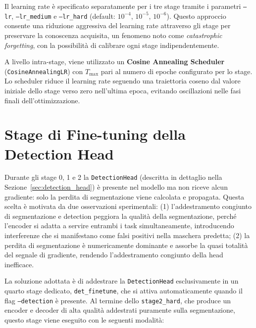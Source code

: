 Il learning rate è specificato separatamente per i tre stage tramite i parametri \texttt{--lr}, \texttt{--lr\_medium} e \texttt{--lr\_hard} (default: $10^{-4}$, $10^{-5}$, $10^{-6}$). Questo approccio consente una riduzione aggressiva del learning rate attraverso gli stage per preservare la conoscenza acquisita, un fenomeno noto come \textit{catastrophic forgetting}, con la possibilità di calibrare ogni stage indipendentemente.

A livello intra-stage, viene utilizzato un \textbf{Cosine Annealing Scheduler}~\cite{loshchilov2017sgdrstochasticgradientdescent} (\texttt{CosineAnnealingLR}) con $T_{\max}$ pari al numero di epoche configurato per lo stage. Lo scheduler riduce il learning rate seguendo una traiettoria coseno dal valore iniziale dello stage verso zero nell'ultima epoca, evitando oscillazioni nelle fasi finali dell'ottimizzazione.

\section{Stage di Fine-tuning della Detection Head}
\label{sec:det_finetune}

Durante gli stage 0, 1 e 2 la \texttt{DetectionHead} (descritta in dettaglio nella Sezione~\ref{sec:detection_head}) è presente nel modello ma non riceve alcun gradiente: solo la perdita di segmentazione viene calcolata e propagata. Questa scelta è motivata da due osservazioni sperimentali: (1) l'addestramento congiunto di segmentazione e detection peggiora la qualità della segmentazione, perché l'encoder si adatta a servire entrambi i task simultaneamente, introducendo interferenze che si manifestano come falsi positivi nella maschera predetta; (2) la perdita di segmentazione è numericamente dominante e assorbe la quasi totalità del segnale di gradiente, rendendo l'addestramento congiunto della head inefficace.

La soluzione adottata è di addestrare la \texttt{DetectionHead} esclusivamente in un quarto stage dedicato, \texttt{det\_finetune}, che si attiva automaticamente quando il flag \texttt{--detection} è presente. Al termine dello \texttt{stage2\_hard}, che produce un encoder e decoder di alta qualità addestrati puramente sulla segmentazione, questo stage viene eseguito con le seguenti modalità:

